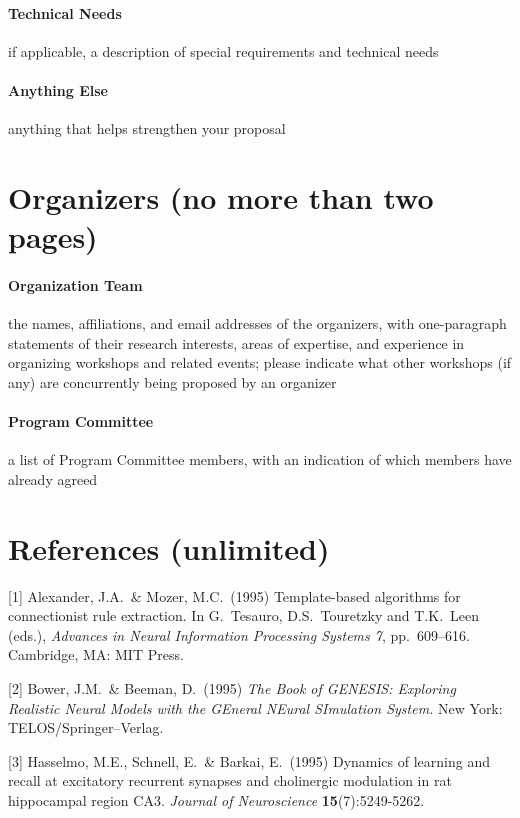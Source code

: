 \documentclass{article}
\begin{document}
\paragraph{Technical Needs}
if applicable, a description of special requirements and technical needs

\paragraph{Anything Else}

anything that helps strengthen your proposal

\newpage

\section*{Organizers (no more than two pages)}

\paragraph{Organization Team}

the names, affiliations, and email addresses of the organizers, with one-paragraph statements of their research interests, areas of expertise, and experience in organizing workshops and related events; please indicate what other workshops (if any) are concurrently being proposed by an organizer

\paragraph{Program Committee}

a list of Program Committee members, with an indication of which members have already agreed

\newpage

\section*{References (unlimited)}

{
\small


[1] Alexander, J.A.\ \& Mozer, M.C.\ (1995) Template-based algorithms for
connectionist rule extraction. In G.\ Tesauro, D.S.\ Touretzky and T.K.\ Leen
(eds.), {\it Advances in Neural Information Processing Systems 7},
pp.\ 609--616. Cambridge, MA: MIT Press.


[2] Bower, J.M.\ \& Beeman, D.\ (1995) {\it The Book of GENESIS: Exploring
  Realistic Neural Models with the GEneral NEural SImulation System.}  New York:
TELOS/Springer--Verlag.


[3] Hasselmo, M.E., Schnell, E.\ \& Barkai, E.\ (1995) Dynamics of learning and
recall at excitatory recurrent synapses and cholinergic modulation in rat
hippocampal region CA3. {\it Journal of Neuroscience} {\bf 15}(7):5249-5262.
}

\end{document}
